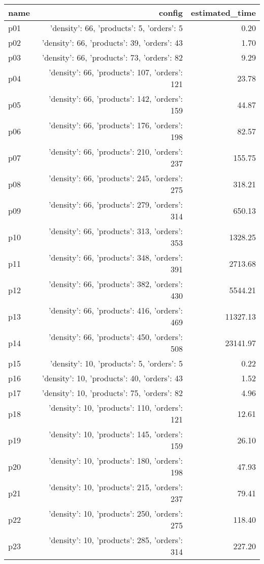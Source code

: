 \documentclass{article}
\begin{document}
                            \begin{center}
                            \scriptsize
                            \begin{tabular}{@{}l|r|r@{}}
                            name & config & estimated\_time\\\midrule
                              p01&{'density': 66, 'products': 5, 'orders': 5}&0.20\\
  p02&{'density': 66, 'products': 39, 'orders': 43}&1.70\\
  p03&{'density': 66, 'products': 73, 'orders': 82}&9.29\\
  p04&{'density': 66, 'products': 107, 'orders': 121}&23.78\\
  p05&{'density': 66, 'products': 142, 'orders': 159}&44.87\\
  p06&{'density': 66, 'products': 176, 'orders': 198}&82.57\\
  p07&{'density': 66, 'products': 210, 'orders': 237}&155.75\\
  p08&{'density': 66, 'products': 245, 'orders': 275}&318.21\\
  p09&{'density': 66, 'products': 279, 'orders': 314}&650.13\\
  p10&{'density': 66, 'products': 313, 'orders': 353}&1328.25\\
  p11&{'density': 66, 'products': 348, 'orders': 391}&2713.68\\
  p12&{'density': 66, 'products': 382, 'orders': 430}&5544.21\\
  p13&{'density': 66, 'products': 416, 'orders': 469}&11327.13\\
  p14&{'density': 66, 'products': 450, 'orders': 508}&23141.97\\
  p15&{'density': 10, 'products': 5, 'orders': 5}&0.22\\
  p16&{'density': 10, 'products': 40, 'orders': 43}&1.52\\
  p17&{'density': 10, 'products': 75, 'orders': 82}&4.96\\
  p18&{'density': 10, 'products': 110, 'orders': 121}&12.61\\
  p19&{'density': 10, 'products': 145, 'orders': 159}&26.10\\
  p20&{'density': 10, 'products': 180, 'orders': 198}&47.93\\
  p21&{'density': 10, 'products': 215, 'orders': 237}&79.41\\
  p22&{'density': 10, 'products': 250, 'orders': 275}&118.40\\
  p23&{'density': 10, 'products': 285, 'orders': 314}&227.20\\

\end{tabular}
\end{center}
\end{document}
